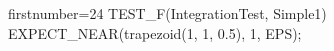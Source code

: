 \begin{cppcode*}{firstnumber=24}
TEST_F(IntegrationTest, Simple1) {
    EXPECT_NEAR(trapezoid(1, 1, 0.5), 1, EPS);
}
\end{cppcode*}

